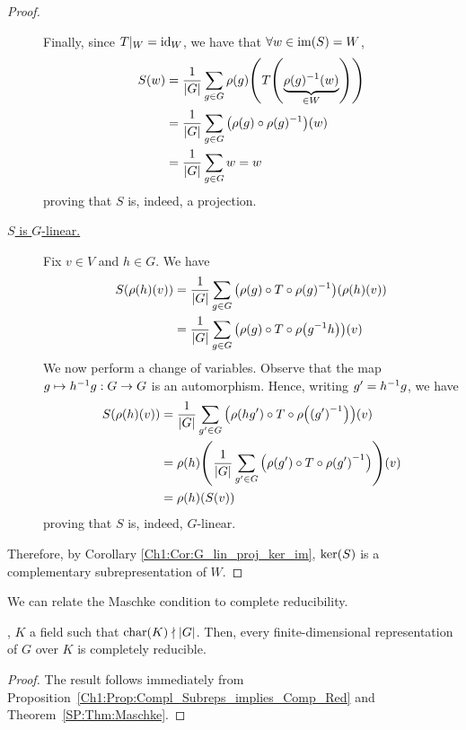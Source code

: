 \begin{proof}
\begin{description}
        Finally, since $T\vert_W = \operatorname{id}_W$, we have that $\forall w \in \operatorname{im}\!\left( S \right) = W$,
        \begin{align*}
            S(w) &= \frac{1}{\left\lvert G \right\rvert} \sum_{g \in G} \rho(g)\!\left( T\!\left( \underbrace{\rho(g)^{-1}(w)}_{\in W} \right) \right) \\
            &= \frac{1}{\left\lvert G \right\rvert} \sum_{g \in G} \left( \rho(g) \circ \rho(g)^{-1} \right)\!(w) \\
            &= \frac{1}{\left\lvert G \right\rvert} \sum_{g \in G} w = w
        \end{align*}
        proving that $S$ is, indeed, a projection.

        \item[\underline{$S$ is $G$-linear.}]
        Fix $v \in V$ and $h \in G$. We have
        \begin{align*}
            S\!\left( \rho(h)(v) \right) &= \frac{1}{\left\lvert G \right\rvert} \sum_{g \in G} \left( \rho(g) \circ T \circ \rho(g)^{-1} \right)\!\left( \rho(h)(v) \right) \\
            &=  \frac{1}{\left\lvert G \right\rvert} \sum_{g \in G} \left( \rho(g) \circ T \circ \rho\!\left( g^{-1} h \right) \right)\!(v)
        \end{align*}
        We now perform a change of variables. Observe that the map $g \mapsto h^{-1} g : G \to G$ is an automorphism. Hence, writing $g' = h^{-1} g$, we have
        \begin{align*}
            \Sof{\rho(h)(v)} &=  \frac{1}{\abs{G}} \sum_{g' \in G} \parenth{\rhoof{hg'} \circ T \circ \rhoof{\parenth{g'}\inv}}\!(v) \\
            &= \rhoof{h}\!\parenth{ \frac{1}{\abs{G}} \sum_{g' \in G} \parenth{\rhoof{g'} \circ T \circ \rhoof{g'}\inv}}\!(v) \\
            &= \rho(h)\!\parenth{\Sof{v}}
        \end{align*}
        proving that $S$ is, indeed, $G$-linear.
    \end{description}
    Therefore, by Corollary \ref{Ch1:Cor:G_lin_proj_ker_im}, $\operatorname{ker}\!\left( S \right)$ is a complementary subrepresentation of $W$.
\end{proof}

We can relate the Maschke condition to complete reducibility.

\begin{corollary} \label{Ch1:Cor:Maschke}
    , $K$ a field such that $\operatorname{char}\!\left( K \right) \nmid \left\lvert G \right\rvert$. Then, every finite-dimensional representation of $G$ over $K$ is completely reducible.
\end{corollary}
\begin{proof}
    The result follows immediately from Proposition~\ref{Ch1:Prop:Compl_Subreps_implies_Comp_Red} and Theorem~\ref{SP:Thm:Maschke}.
\end{proof}

